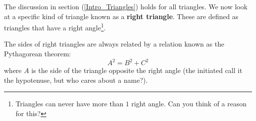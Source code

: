 \noindent The discussion in section (\ref{Intro_Triangles}) holds for all triangles. We now look at a specific kind of triangle known as a \textbf{right triangle}. These are defined as triangles that have a right angle\footnote{Triangles can never have more than $1$ right angle. Can you think of a reason for this?}.
\begin{center}
\end{center}
\noindent The sides of right triangles are always related by a relation known as the Pythagorean theorem:
$$
A^2 = B^2 + C^2
$$
\noindent where $A$ is the side of the triangle opposite the right angle (the initiated call it the hypotenuse, but who cares about a name?).\\

